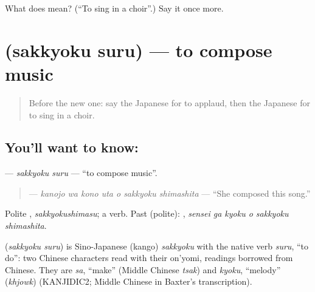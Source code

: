 \begin{tcolorbox}[breakable,colback=teal!4,colframe=teal!35!black,title={Before you move on}]
What does  mean? (\textquotedblleft{}To sing in a choir\textquotedblright{}.) Say it once more.
\end{tcolorbox}
\section[\texorpdfstring{\ja{さっきょくする} (sakkyoku suru)}{さっきょくする (sakkyoku suru)}]{ (sakkyoku suru) — to compose music}

\label{lesson:JA-C471-sakkyoku-suru}



\begin{quote}
Before the new one: say the Japanese for to applaud, then the Japanese for to sing in a choir.
\end{quote}

\subsection*{You'll want to know: }
\textbf{} — \emph{sakkyoku suru} — \textquotedblleft{}to compose music\textquotedblright{}.

\begin{quote}
\textbf{   } — \emph{kanojo wa kono uta o sakkyoku shimashita} — \textquotedblleft{}She composed this song.\textquotedblright{}
\end{quote}

Polite \textbf{}, \emph{sakkyokushimasu}; a  verb. Past (polite): \textbf{  }, \emph{sensei ga kyoku o sakkyoku shimashita}.

\begin{cousinweb}
\textbf{} (\emph{sakkyoku suru}) is Sino-Japanese (kango) \emph{sakkyoku} with the native verb \emph{suru}, \textquotedblleft{}to do\textquotedblright{}: two Chinese characters read with their on'yomi, readings borrowed from Chinese. They are \emph{sa}, \textquotedblleft{}make\textquotedblright{} (Middle Chinese \emph{tsak}) and \emph{kyoku}, \textquotedblleft{}melody\textquotedblright{} (\emph{khjowk}) (KANJIDIC2; Middle Chinese in Baxter's transcription).
\end{cousinweb}

